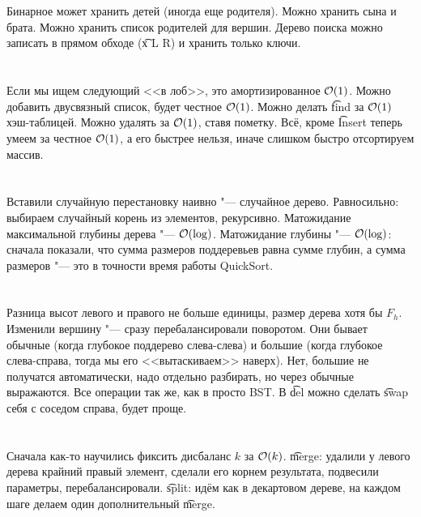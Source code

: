 \section{} %
Бинарное может хранить детей (иногда еще родителя).
Можно хранить сына и брата.
Можно хранить список родителей для вершин.
Дерево поиска можно записать в прямом обходе (\t{x L R}) и хранить только ключи.

\section{} %
Если мы ищем следующий <<в лоб>>, это амортизированное $\mathcal{O}(1)$.
Можно добавить двусвязный список, будет честное $\mathcal{O}(1)$.
Можно делать \t{find} за $\mathcal{O}(1)$ хэш-таблицей.
Можно удалять за $\mathcal{O}(1)$, ставя пометку.
Всё, кроме \t{Insert} теперь умеем за честное $\mathcal{O}(1)$, а его быстрее нельзя, иначе слишком быстро отсортируем массив.

\section{} %
Вставили случайную перестановку наивно "--- случайное дерево.
Равносильно: выбираем случайный корень из элементов, рекурсивно.
Матожидание максимальной глубины дерева "--- $\mathcal{O}(\log)$.
Матожидание глубины "--- $\mathcal{O}(\log)$:
сначала показали, что сумма размеров поддеревьев равна сумме глубин,
а сумма размеров "--- это в точности время работы QuickSort.

\section{} %
Разница высот левого и правого не больше единицы, размер дерева хотя бы $F_h$.
Изменили вершину "--- сразу перебалансировали поворотом.
Они бывает обычные (когда глубокое поддерево слева-слева)
и большие (когда глубокое слева-справа, тогда мы его <<вытаскиваем>> наверх).
Нет, большие не получатся автоматически, надо отдельно разбирать, но через обычные выражаются.
Все операции так же, как в просто BST.
В \t{del} можно сделать \t{swap} себя с соседом справа, будет проще.

\section{} %
Сначала как-то научились фиксить дисбаланс $k$ за $\mathcal{O}(k)$. \TODO
\t{merge}: удалили у левого дерева крайний правый элемент, сделали его корнем результата, подвесили параметры, перебалансировали.
\t{split}: идём как в декартовом дереве, на каждом шаге делаем один дополнительный \t{merge}.

